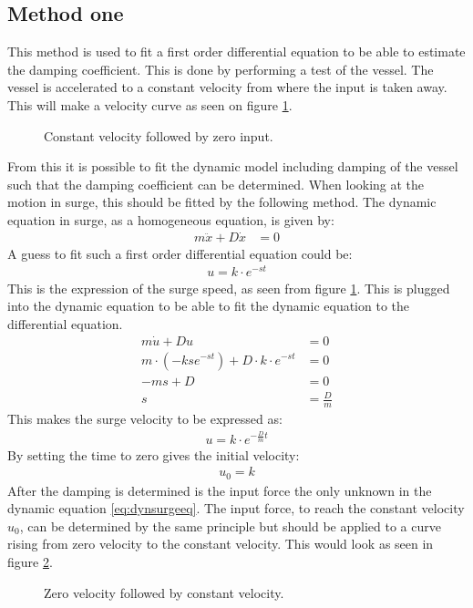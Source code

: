 \subsection{Method one}
This method is used to fit a first order differential equation to be able to estimate the damping coefficient. This is done by performing a test of the vessel. The vessel is accelerated to a constant velocity from where the input is taken away. This will make a velocity curve as seen on figure \ref{fig:phase3}.
\begin{figure}[htbp]
	\centering
	
	\caption{Constant velocity followed by zero input.}
	\label{fig:phase3}
\end{figure}
From this it is possible to fit the dynamic model including damping of the vessel such that the damping coefficient can be determined. When looking at the motion in surge, this should be fitted by the following method. The dynamic equation in surge, as a homogeneous equation, is given by:
\begin{align}
m \ddot x + D \dot x &= 0
\label{eq:dynsurgeeq}
\end{align}
A guess to fit such a first order differential equation could be:
\begin{align}
u = k \cdot e^{-st}
\end{align}
This is the expression of the surge speed, as seen from figure \ref{fig:phase3}. This is plugged into the dynamic equation to be able to fit the dynamic equation to the differential equation.
\begin{align}
m \dot u + Du &= 0\\
m \cdot (-kse^{-st}) + D \cdot k \cdot e^{-st} &= 0\\
-ms+D&=0\\
s&=\frac{D}{m}
\end{align}
This makes the surge velocity to be expressed as:
\begin{align}
u = k \cdot e^{-\frac{D}{m}t}
\end{align}
By setting the time to zero gives the initial velocity:
\begin{align}
u_0 = k
\end{align}
After the damping is determined is the input force the only unknown in the dynamic equation \eqref{eq:dynsurgeeq}. The input force, to reach the constant velocity $u_0$, can be determined by the same principle but should be applied to a curve rising from zero velocity to the constant velocity. This would look as seen in figure \ref{fig:phase1}.
\begin{figure}[htbp]
	\centering
	
	\caption{Zero velocity followed by constant velocity.}
	\label{fig:phase1}
\end{figure}
